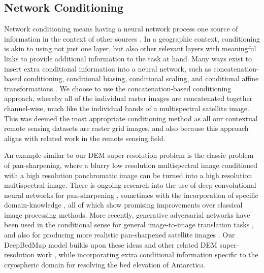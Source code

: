 \documentclass[tc, manuscript]{copernicus}
\begin{document}
\subsection{Network Conditioning} \label{section:networkconditioning}

Network conditioning means having a neural network process one source of information in the context of other sources \citep{DumoulinFeaturewisetransformations2018}.
In a geographic context, conditioning is akin to using not just one layer, but also other relevant layers with meaningful links to provide additional information to the task at hand.
Many ways exist to insert extra conditional information into a neural network, such as concatenation-based conditioning, conditional biasing, conditional scaling, and conditional affine transformations \citep{DumoulinFeaturewisetransformations2018}.
We choose to use the concatenation-based conditioning approach, whereby all of the individual raster images are concatenated together channel-wise, much like the individual bands of a multispectral satellite image.
This was deemed the most appropriate conditioning method as all our contextual remote sensing datasets are raster grid images, and also because this approach aligns with related work in the remote sensing field.

An example similar to our DEM super-resolution problem is the classic problem of pan-sharpening, where a blurry low resolution multispectral image conditioned with a high resolution panchromatic image can be turned into a high resolution multispectral image.
There is ongoing research into the use of deep convolutional neural networks for pan-sharpening \citep{MasiPansharpeningConvolutionalNeural2016,ScarpaTargetAdaptiveCNNBasedPansharpening2018}, sometimes with the incorporation of specific domain-knowledge \citep{YangPanNetDeepNetwork2017}, all of which show promising improvements over classical image processing methods.
More recently, generative adversarial networks \citep{GoodfellowGenerativeAdversarialNetworks2014} have been used in the conditional sense for general image-to-image translation tasks \citep[e.g.][]{IsolaImagetoImageTranslationConditional2016,ParkSemanticImageSynthesis2019}, and also for producing more realistic pan-sharpened satellite images \citep{LiuPSGANGenerativeAdversarial2018}.
Our DeepBedMap model builds upon these ideas and other related DEM super-resolution work \citep{XuNonlocalsimilaritybased2015,ChenConvolutionalNeuralNetwork2016}, while incorporating extra conditional information specific to the cryospheric domain for resolving the bed elevation of Antarctica.
\end{document}
